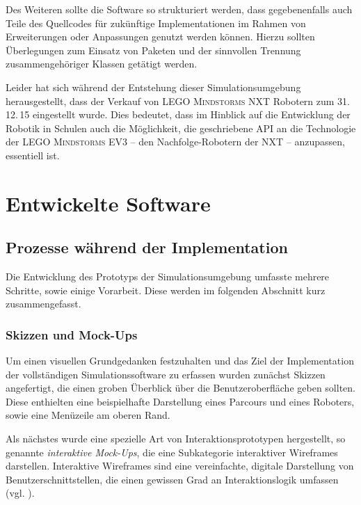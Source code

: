\documentclass[paper=a4, DIV=calc, BCOR=12mm, twoside=on, onecolumn=on, open = right, titlepage =on, parskip =half-, headsepline = on, footsepline = off, chapterprefix = off, appendixprefix = on, fontsize = 12pt, numbers = noenddot, abstract = on]{scrbook}
\begin{document}
Des Weiteren sollte die Software so strukturiert werden, dass gegebenenfalls auch Teile des Quellcodes für zukünftige Implementationen im Rahmen von Erweiterungen oder Anpassungen genutzt werden können. Hierzu sollten Überlegungen zum Einsatz von Paketen und der sinnvollen Trennung zusammengehöriger Klassen getätigt werden.

Leider hat sich während der Entstehung dieser Simulationsumgebung herausgestellt, dass der Verkauf von \textsc{LEGO Mindstorms} NXT Robotern zum 31.\,12.\,15 eingestellt wurde. Dies bedeutet, dass im Hinblick auf die Entwicklung der Robotik in Schulen auch die Möglichkeit, die geschriebene API an die Technologie der \textsc{LEGO Mindstorms} EV3 --  den Nachfolge-Robotern der NXT -- anzupassen, essentiell ist.


\par \singlespacing
\chapter{Entwickelte Software}
\onehalfspacing
\par \singlespacing
\section{Prozesse während der Implementation}
\onehalfspacing
Die Entwicklung des Prototyps der Simulationsumgebung umfasste mehrere Schritte, sowie einige Vorarbeit. Diese werden im folgenden Abschnitt kurz zusammengefasst.
\par \singlespacing
\subsection{Skizzen und Mock-Ups} 
\onehalfspacing
Um einen visuellen Grundgedanken festzuhalten und das Ziel der Implementation der vollständigen Simulationssoftware zu erfassen wurden zunächst Skizzen angefertigt, die einen groben Überblick über die Benutzeroberfläche geben sollten. Diese enthielten eine beispielhafte Darstellung eines Parcours und eines Roboters, sowie eine Menüzeile am oberen Rand. 

Als nächstes wurde eine spezielle Art von Interaktionsprototypen hergestellt, so genannte \emph{interaktive Mock-Ups}, die eine Subkategorie interaktiver Wireframes darstellen. Interaktive Wireframes sind eine vereinfachte, digitale Darstellung von Benutzerschnittstellen, die einen gewissen Grad an Interaktionslogik umfassen (vgl. \cite[S.162ff.]{moser:12}).
\end{document}
